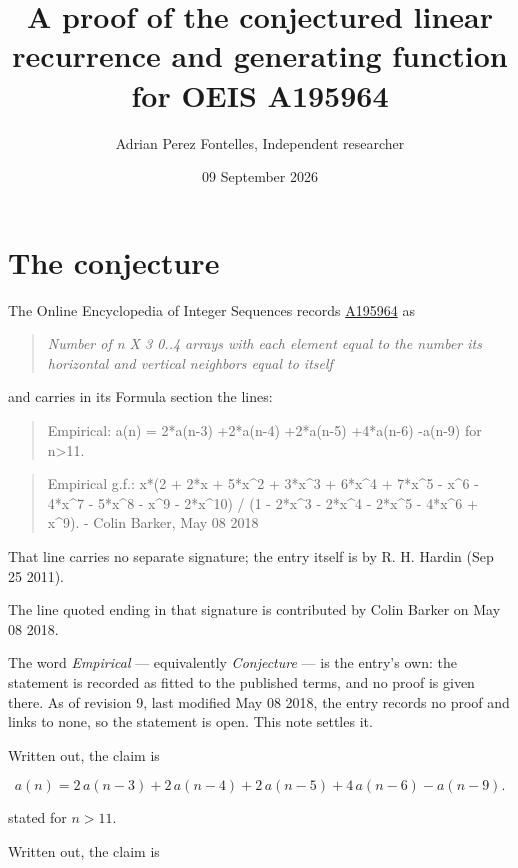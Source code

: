 \documentclass[11pt]{article}
\title{A proof of the conjectured linear recurrence and generating function for OEIS A195964}
\author{Adrian Perez Fontelles, Independent researcher}
\date{09 September 2026}
\theoremstyle{definition}
\begin{document}
\maketitle
\section{The conjecture}

The Online Encyclopedia of Integer Sequences records \href{https://oeis.org/A195964}{A195964} as

\begin{quote}\itshape Number of n X 3 0..4 arrays with each element equal to the number its horizontal and vertical neighbors equal to itself\end{quote}

and carries in its Formula section the lines:

\begin{quote}\ttfamily Empirical: a(n) = 2*a(n-3) +2*a(n-4) +2*a(n-5) +4*a(n-6) -a(n-9) for n>11.\end{quote}

\begin{quote}\ttfamily Empirical g.f.: x*(2 + 2*x + 5*x\textasciicircum{}2 + 3*x\textasciicircum{}3 + 6*x\textasciicircum{}4 + 7*x\textasciicircum{}5 - x\textasciicircum{}6 - 4*x\textasciicircum{}7 - 5*x\textasciicircum{}8 - x\textasciicircum{}9 - 2*x\textasciicircum{}10) / (1 - 2*x\textasciicircum{}3 - 2*x\textasciicircum{}4 - 2*x\textasciicircum{}5 - 4*x\textasciicircum{}6 + x\textasciicircum{}9). - Colin Barker, May 08 2018\end{quote}

That line carries no separate signature; the entry itself is by R. H. Hardin (Sep 25 2011).

The line quoted ending in that signature is contributed by Colin Barker on May 08 2018.

The word {\itshape Empirical} --- equivalently {\itshape Conjecture} --- is the entry's own: the statement is recorded as fitted to the published terms, and no proof is given there. As of revision 9, last modified May 08 2018, the entry records no proof and links to none, so the statement is open. This note settles it.

Written out, the claim is

\[a(n) = 2\,a(n-3) + 2\,a(n-4) + 2\,a(n-5) + 4\,a(n-6) - a(n-9).\]

stated for $n > 11$.

Written out, the claim is
\end{document}
